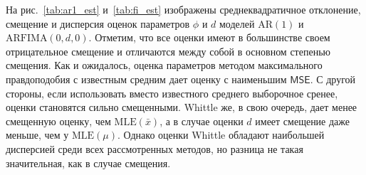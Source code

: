 \documentclass[specialist,
substylefile = spbu_report.rtx,
subf,href,colorlinks=true, 12pt]{disser}
\theoremstyle{definition}
\begin{document}
На рис.~\ref{tab:ar1_est} и~\ref{tab:fi_est} изображены среднеквадратичное отклонение, смещение и дисперсия оценок параметров $\phi$ и $d$ моделей $\mathrm{AR}(1)$ и $\mathrm{ARFIMA}(0, d, 0)$. Отметим, что все оценки имеют в большинстве своем отрицательное смещение и отличаются между собой в основном степенью смещения. Как и ожидалось, оценка параметров методом максимального правдоподобия с известным средним дает оценку с наименьшим $\mathsf{MSE}$. С другой стороны, если использовать вместо известного среднего выборочное сренее, оценки становятся сильно смещенными. Whittle же, в свою очередь, дает менее смещенную оценку, чем $\mathrm{MLE}(\bar x)$, а в случае оценки $d$ имеет смещение даже меньше, чем у $\mathrm{MLE}(\mu)$. Однако оценки Whittle обладают наибольшей дисперсией среди всех рассмотренных методов, но разница не такая значительная, как в случае смещения.
\end{document}

